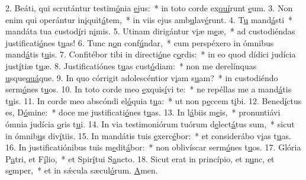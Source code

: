2. Beáti, qui scrutántur testim\uline{ó}nia \uline{e}jus:~* in toto corde ex\uline{quí}runt \uline{e}um.
3. Non enim qui operántur in\uline{i}quit\uline{á}tem,~* in viis ejus amb\uline{u}lav\uline{é}runt.
4. T\uline{u} mand\uline{á}sti~* mandáta tua custod\uline{í}ri n\uline{i}mis.
5. Utinam dirigántur v\uline{i}æ m\uline{e}æ,~* ad custodiéndas justificati\uline{ó}nes t\uline{u}as!
6. Tunc n\uline{o}n conf\uline{ú}ndar,~* cum perspéxero in ómnibus mand\uline{á}tis t\uline{u}is.
7. Confitébor tibi in directi\uline{ó}ne c\uline{o}rdis:~* in eo quod dídici judícia just\uline{í}tiæ t\uline{u}æ.
8. Justificatiónes t\uline{u}as cust\uline{ó}diam:~* non me derelínquas \uline{u}sque\uline{quá}que.
9. In quo córrigit adolescéntior v\uline{i}am s\uline{u}am?~* in custodiéndo serm\uline{ó}nes t\uline{u}os.
10. In toto corde meo \uline{e}xquis\uline{í}vi te:~* ne repéllas me a mand\uline{á}tis t\uline{u}is.
11. In corde meo abscóndi el\uline{ó}quia t\uline{u}a:~* ut non p\uline{e}ccem t\uline{i}bi.
12. Bened\uline{í}ctus es, D\uline{ó}mine:~* doce me justificati\uline{ó}nes t\uline{u}as.
13. In l\uline{á}biis m\uline{e}is,~* pronuntiávi ómnia judícia \uline{o}ris t\uline{u}i.
14. In via testimoniórum tuórum d\uline{e}lect\uline{á}tus sum,~* sicut in ómnib\uline{u}s div\uline{í}tiis.
15. In mandátis tuis \uline{e}xerc\uline{é}bor:~* et considerábo v\uline{i}as t\uline{u}as.
16. In justificatiónibus tuis m\uline{e}dit\uline{á}bor:~* non oblivíscar serm\uline{ó}nes t\uline{u}os.
17. Glória P\uline{a}tri, et F\uline{í}lio,~* et Spir\uline{í}tui S\uline{a}ncto.
18. Sicut erat in princípio, et n\uline{u}nc, et s\uline{e}mper,~* et in sǽcula sæcul\uline{ó}rum. \uline{A}men.
